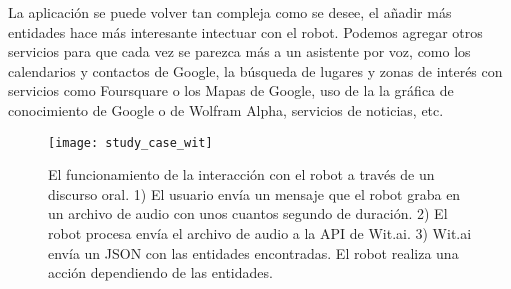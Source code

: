 La aplicación se puede volver tan compleja como se desee,
el añadir más entidades hace más interesante intectuar con el
robot. Podemos agregar otros servicios para
que cada vez se parezca más a un asistente por voz,
como los calendarios y contactos de Google, la búsqueda de lugares y
zonas de interés con servicios como Foursquare o los Mapas de Google,
uso de la la gráfica de conocimiento de Google o de Wolfram Alpha, 
servicios de noticias, etc.

\begin{figure}[!h]
\centering
\caption{El funcionamiento de la interacción con el robot a través de un discurso
oral. 1) El usuario envía un mensaje que el robot graba en un archivo de audio
con unos cuantos segundo de duración. 2) El robot procesa envía el archivo de audio
a la API de Wit.ai. 3) Wit.ai envía un JSON con las entidades encontradas. El robot realiza una acción dependiendo de las entidades.}
\texttt{[image: study\_case\_wit]}
\end{figure}

